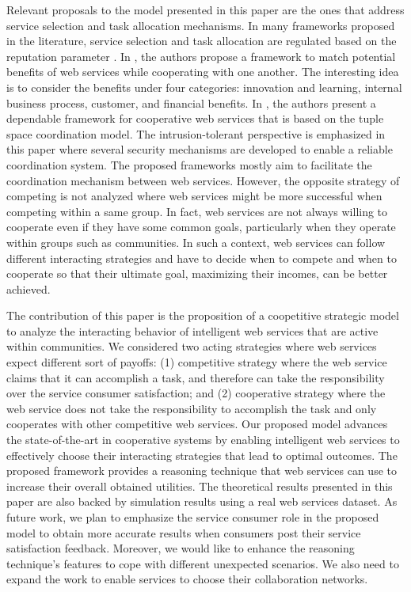 \documentclass[runningheads,a4paper]{llncs}
\begin{document}
Relevant proposals to the model presented in this paper are the
ones that address service selection and task allocation
mechanisms. In many frameworks proposed in the literature, service
selection and task allocation are regulated based on the
reputation parameter \cite{Maximilien2,Kalepu,Rosario,Ruth}. In
\cite{Huang}, the authors propose a framework to match potential
benefits of web services while cooperating with one another. The
interesting idea is to consider the benefits under four
categories: innovation and learning, internal business process,
customer, and financial benefits. In \cite{Alchieri}, the authors
present a dependable framework for cooperative web services that
is based on the tuple space coordination model. The
intrusion-tolerant perspective is emphasized in this paper where
several security mechanisms are developed to enable a reliable
coordination system. %
The proposed frameworks mostly aim to facilitate the coordination
mechanism between web services. However, the opposite strategy of
competing is not analyzed where web services might be more
successful when competing within a same group. In fact, web
services are not always willing to cooperate even if they have
some common goals, particularly when they operate within groups
such as communities. In such a context, web services can follow
different interacting strategies and have to decide when to
compete and when to cooperate so that their ultimate goal,
maximizing their incomes, can be better achieved.

The contribution of this paper is the proposition of a coopetitive
strategic model to analyze the interacting behavior of intelligent
web services that are active within communities. We considered two
acting strategies where web services expect different sort of
payoffs: (1) competitive strategy where the web service claims
that it can accomplish a task, and therefore can take the
responsibility over the service consumer satisfaction; and (2)
cooperative strategy where the web service does not take the
responsibility to accomplish the task and only cooperates with
other competitive web services. Our proposed model advances the
state-of-the-art in cooperative systems by enabling intelligent
web services to effectively choose their interacting strategies
that lead to optimal outcomes. The proposed framework provides a
reasoning technique that web services can use to increase their
overall obtained utilities. The theoretical results presented in
this paper are also backed by simulation results using a real web
services dataset. As future work, we plan to emphasize the service
consumer role in the proposed model to obtain more accurate
results when consumers post their service satisfaction feedback.
Moreover, we would like to enhance  the reasoning technique's
features to cope with different unexpected scenarios. We also need
to expand the work to enable services to choose their
collaboration networks.
\end{document}

